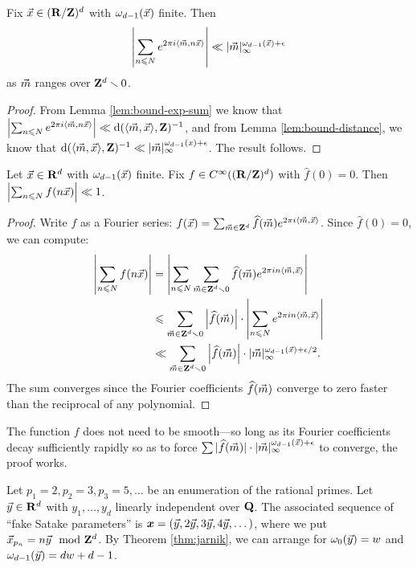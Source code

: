 \begin{theorem}
Fix $\vec{x}\in (\mathbf{R}/\mathbf{Z})^d$ with $\omega_{d-1}(\vec{x})$ finite. Then 
\[
	\left| \sum_{n\leqslant N} e^{2\pi i \langle \vec{m}, n \vec{x}\rangle}\right| \ll |\vec{m}|_\infty^{\omega_{d-1}(\vec{x}) + \epsilon} 
\]
as $\vec{m}$ ranges over $\mathbf{Z}^d\smallsetminus 0$. 
\end{theorem}
\begin{proof}
From Lemma \ref{lem:bound-exp-sum} we know that 
$\left| \sum_{n\leqslant N} e^{2\pi i \langle \vec{m}, n \vec{x}\rangle}\right| \ll \mathrm{d}(\langle \vec{m}, \vec{x}\rangle,\mathbf{Z})^{-1}$, 
and from Lemma \ref{lem:bound-distance}, we know that 
$\mathrm{d}(\langle \vec{m},\vec{x}\rangle, \mathbf{Z})^{-1} \ll |\vec{m}|_\infty^{\omega_{d-1}(x)+\epsilon}$. 
The result follows. 
\end{proof}

\begin{theorem}\label{thm:translates-bound-sum}
Let $\vec{x}\in \mathbf{R}^d$ with $\omega_{d-1}(\vec{x})$ finite. Fix 
$f\in C^\infty((\mathbf{R}/\mathbf{Z})^d)$ with $\widehat f(0)=0$. Then 
$\left| \sum_{n\leqslant N} f(n \vec{x})\right| \ll 1$. 
\end{theorem}
\begin{proof}
Write $f$ as a Fourier series:
$f(\vec{x}) = \sum_{\vec{m}\in \mathbf{Z}^d} \widehat f(\vec{m}) e^{2\pi i \langle \vec{m},\vec{x}\rangle}$. 
Since $\widehat f(0)=0$, we can compute:
\begin{align*}
	\left| \sum_{n\leqslant N} f(n \vec{x})\right| 
		&= \left| \sum_{n\leqslant N} \sum_{\vec{m}\in \mathbf{Z}^d\smallsetminus 0} \widehat f(\vec{m}) e^{2\pi i n \langle \vec{m},\vec{x}\rangle}\right| \\
		&\leqslant \sum_{\vec{m}\in \mathbf{Z}^d\smallsetminus 0} \left|\widehat f(\vec{m})\right|\cdot \left| \sum_{n\leqslant N} e^{2\pi i n \langle \vec{m},\vec{x}\rangle}\right| \\
		&\ll \sum_{\vec{m}\in \mathbf{Z}^d\smallsetminus 0} \left|\widehat f(\vec{m})\right|\cdot |\vec{m}|_\infty^{\omega_{d-1}(\vec{x}) + \epsilon/2} .
\end{align*}
The sum converges since the Fourier coefficients $\widehat f(\vec{m})$ converge to 
zero faster than the reciprocal of any polynomial. 
\end{proof}

The function $f$ does not need to be smooth---so long as its Fourier 
coefficients decay sufficiently rapidly so as to force 
$\sum |\widehat f(\vec{m})| \cdot |\vec{m}|_\infty^{\omega_{d-1}(\vec{x})+\epsilon}$ to 
converge, the proof works. 


Let $p_1 = 2, p_2 = 3, p_3 = 5, \dots$ be an enumeration of the rational primes. 
Let $\vec{y}\in \mathbf{R}^d$ with $y_1,\dots,y_d$ linearly independent over $\mathbf{Q}$. The 
associated sequence of ``fake Satake parameters'' is 
${\boldsymbol x} = (\vec{y}, 2\vec{y}, 3 \vec{y}, 4 \vec{y}, \dots)$, 
where we put $\vec{x}_{p_n} = n \vec{y}\mod {\mathbf{Z}}^d$. By Theorem \ref{thm:jarnik}, we can 
arrange for $\omega_0(\vec{y}) = w$ and $\omega_{d-1}(\vec{y}) = d w + d - 1$. 

